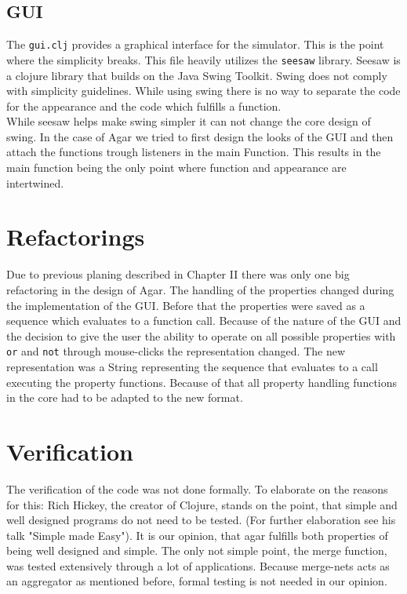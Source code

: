 \documentclass[twoside]{article}
\begin{document}
\begin{multicols}{2}
\subsection{GUI}
The \texttt{gui.clj} provides a graphical interface for the simulator. This is the point
where the simplicity breaks. This file heavily utilizes the \texttt{seesaw} library. Seesaw
is a clojure library that builds on the Java Swing Toolkit. Swing does not comply with simplicity
guidelines. While using swing there is no way to separate the code for the appearance and the code which fulfills 
a function. \\
While seesaw helps make swing simpler it can not change the core design of swing. In the case of Agar we tried
to first design the looks of the GUI and then attach the functions trough listeners in the main Function.
This results in the main function being the only point where function and appearance are intertwined. 

\section{Refactorings}
Due to previous planing described in Chapter II there was only one big refactoring in the design of Agar.
The handling of the properties changed during the implementation of the GUI. Before that the properties were
saved as a sequence which evaluates to a function call. Because of the nature of the GUI and the decision to give the
user the ability to operate on all possible properties with \texttt{or} and \texttt{not} through  mouse-clicks the
representation changed. The new representation was a String representing the sequence that evaluates to a call
executing the property functions. Because of that all property handling functions in the core had to be adapted to the new format.

\section{Verification}
The verification of the code was not done formally. To elaborate on the reasons for this:
Rich Hickey, the creator of Clojure, stands on the point, that simple and well designed 
programs do not need to be tested. (For further elaboration see his talk "Simple made Easy").
It is our opinion, that agar fulfills both properties of being well designed and simple.
The only not simple point, the merge function, was tested extensively through a lot of applications.
Because merge-nets acts as an aggregator as mentioned before, formal testing is not needed in our 
opinion. 



\end{multicols}
\end{document}
